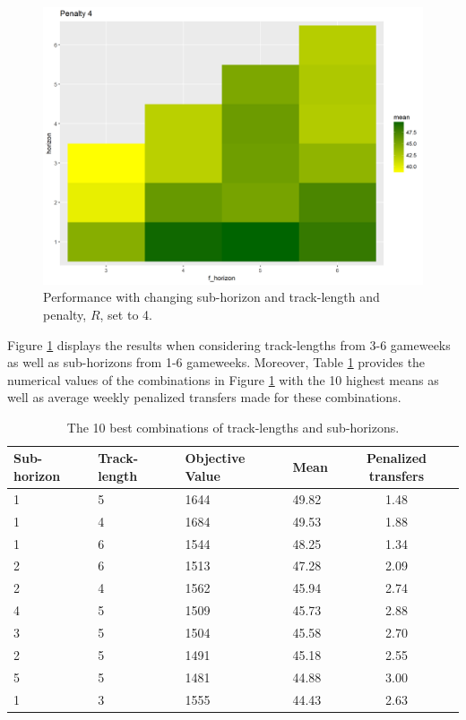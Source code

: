 \begin{figure}[H]
    \centering
    \includegraphics[scale=0.5]{fig/chapter_6/pen_4.png}
    \caption{Performance with changing sub-horizon and track-length and penalty, $R$, set to 4.}
\label{fig:pen_4}    
\end{figure}

Figure \ref{fig:pen_4} displays the results when considering track-lengths from 3-6 gameweeks as well as sub-horizons from 1-6 gameweeks.  Moreover, Table \ref{tab:pen_4_ill_trans} provides the numerical values of the combinations in Figure \ref{fig:pen_4} with the 10 highest means as well as average weekly penalized transfers made for these combinations.




\begin{table}[H]
\centering
\begin{tabular}{|l|l|l|l|c|}
\hline
Sub-horizon & Track-length & Objective Value & Mean & Penalized transfers \\
\hline
1       & 5          & 1644             & 49.82 & 1.48       \\
1       & 4          & 1684             & 49.53 & 1.88       \\
1       & 6          & 1544             & 48.25 & 1.34       \\
2       & 6          & 1513             & 47.28 & 2.09       \\
2       & 4          & 1562             & 45.94 & 2.74       \\
4       & 5          & 1509             & 45.73 & 2.88       \\
3       & 5          & 1504             & 45.58 & 2.70       \\
2       & 5          & 1491             & 45.18 & 2.55       \\
5       & 5          & 1481             & 44.88 & 3.00       \\
1       & 3          & 1555             & 44.43 & 2.63       \\
\hline
\end{tabular}
\caption{The 10 best combinations of track-lengths and sub-horizons.}
\label{tab:pen_4_ill_trans}
\end{table}


